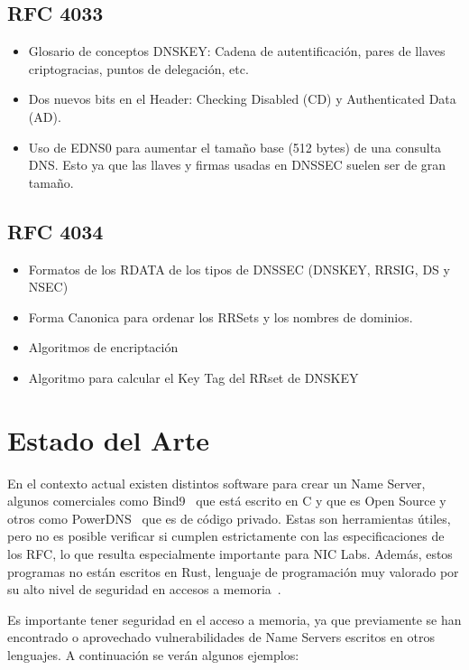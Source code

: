 \subsection{RFC 4033}
\begin{itemize}
    \item Glosario de conceptos DNSKEY: Cadena de autentificación, pares de llaves criptogracias, puntos de delegación, etc.
    \item Dos nuevos bits en el Header: Checking Disabled (CD) y Authenticated Data (AD).
    \item Uso de EDNS0 para aumentar el tamaño base (512 bytes) de una consulta DNS. Esto ya que las llaves y firmas usadas en DNSSEC suelen ser de gran tamaño.
\end{itemize}

\subsection{RFC 4034}
\begin{itemize}
    \item Formatos de los RDATA de los tipos de DNSSEC (DNSKEY, RRSIG, DS y NSEC)
    \item Forma Canonica para ordenar los RRSets y los nombres de dominios.
    \item Algoritmos de encriptación
    \item Algoritmo para calcular el Key Tag del RRset de DNSKEY
\end{itemize}

\section{Estado del Arte}
En el contexto actual existen distintos software para crear un Name Server, algunos comerciales como Bind9~\cite{Bind9} que está escrito en C y que es Open Source y otros como 
PowerDNS~\cite{PowerDNS} que es de código privado. Estas son herramientas útiles, pero no es posible verificar si cumplen estrictamente con las especificaciones de los RFC, 
lo que resulta especialmente importante para NIC Labs. Además, estos programas no están escritos en Rust, lenguaje de programación muy valorado por su alto nivel de seguridad en accesos a 
memoria~\cite{SafeRust}.

Es importante tener seguridad en el acceso a memoria, ya que previamente se han encontrado o aprovechado vulnerabilidades de Name Servers escritos en otros lenguajes. 
A continuación se verán algunos ejemplos:

